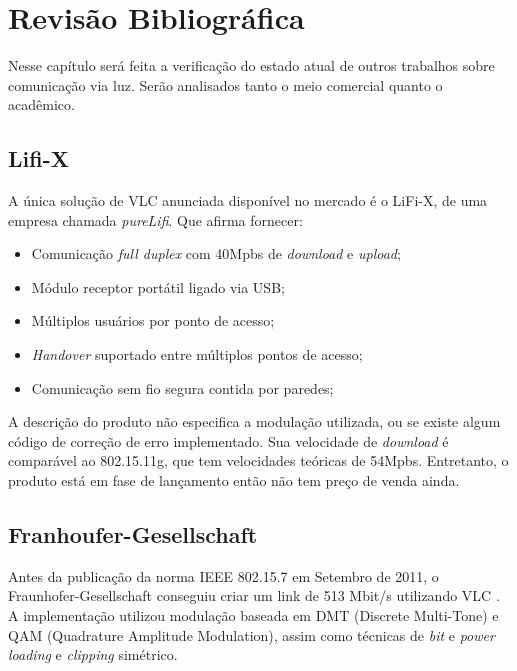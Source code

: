 	\chapter{Revisão Bibliográfica}\label{cap-revisao-bibliografica}
	
	Nesse capítulo será feita a verificação do estado atual de outros trabalhos sobre comunicação via luz. Serão analisados tanto o meio comercial quanto o acadêmico.
	
	\section{Lifi-X}\label{section:lifi-x}
	
	A única solução de VLC anunciada disponível no mercado é o LiFi-X, de uma empresa chamada \textit{pureLifi}. Que afirma fornecer:
	
	\begin{itemize}
		\item Comunicação \textit{full duplex} com 40Mpbs de \textit{download} e \textit{upload};
		\item Módulo receptor portátil ligado via USB;
		\item Múltiplos usuários por ponto de acesso;
		\item \textit{Handover} suportado entre múltiplos pontos de acesso;
		\item Comunicação sem fio segura contida por paredes;
	\end{itemize}

	A descrição do produto não especifica a modulação utilizada, ou se existe algum código de correção de erro implementado. Sua velocidade de \textit{download} é comparável ao 802.15.11g, que tem velocidades teóricas de 54Mpbs. Entretanto, o produto está em fase de lançamento então não tem preço de venda ainda.

	\section{Franhoufer-Gesellschaft}\label{section:fraunhofer}
	
	Antes da publicação da norma IEEE 802.15.7 em Setembro de 2011, o Fraunhofer-Gesellschaft conseguiu criar um link de 513 Mbit/s utilizando VLC \cite{513mb-fraunhofer}. A implementação utilizou modulação baseada em DMT (Discrete Multi-Tone) e QAM (Quadrature Amplitude Modulation), assim como técnicas de \textit{bit} e \textit{power loading} e \textit{clipping} simétrico.
		
